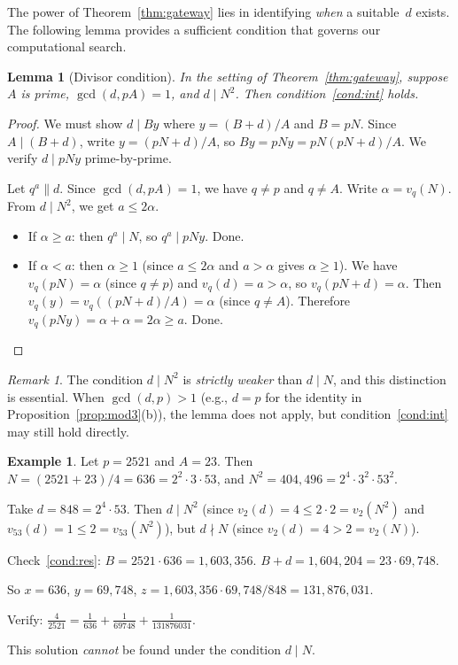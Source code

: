 \documentclass[12pt]{amsart}
\newtheorem{lemma}[theorem]{Lemma}
\theoremstyle{definition}
\newtheorem{example}[theorem]{Example}
\theoremstyle{remark}
\newtheorem{remark}[theorem]{Remark}
\begin{document}
The power of Theorem~\ref{thm:gateway} lies in identifying
\emph{when} a suitable~$d$ exists.
The following lemma provides a sufficient condition that
governs our computational search.

\begin{lemma}[Divisor condition]\label{lem:Nsq}
In the setting of Theorem~\ref{thm:gateway}, suppose $A$ is prime,
$\gcd(d, pA) = 1$, and $d \mid N^2$. Then condition~\ref{cond:int} holds.
\end{lemma}

\begin{proof}
We must show $d \mid By$ where $y = (B+d)/A$ and $B = pN$.
Since $A \mid (B+d)$, write $y = (pN + d)/A$, so $By = pNy = pN(pN+d)/A$.
We verify $d \mid pNy$ prime-by-prime.

Let $q^a \| d$. Since $\gcd(d, pA) = 1$, we have $q \neq p$ and $q \neq A$.
Write $\alpha = v_q(N)$. From $d \mid N^2$, we get $a \leq 2\alpha$.
\begin{itemize}
  \item If $\alpha \geq a$: then $q^a \mid N$, so $q^a \mid pNy$. Done.
  \item If $\alpha < a$: then $\alpha \geq 1$ (since $a \leq 2\alpha$ and $a > \alpha$ gives $\alpha \geq 1$).
    We have $v_q(pN) = \alpha$ (since $q \neq p$) and $v_q(d) = a > \alpha$,
    so $v_q(pN + d) = \alpha$.
    Then $v_q(y) = v_q((pN+d)/A) = \alpha$ (since $q \neq A$).
    Therefore $v_q(pNy) = \alpha + \alpha = 2\alpha \geq a$. Done.
\end{itemize}
\end{proof}

\begin{remark}\label{rem:Nsq}
The condition $d \mid N^2$ is \emph{strictly weaker} than $d \mid N$,
and this distinction is essential.
When $\gcd(d, p) > 1$ (e.g., $d = p$ for the identity in
Proposition~\ref{prop:mod3}(b)), the lemma does not apply,
but condition~\ref{cond:int} may still hold directly.
\end{remark}

\begin{example}\label{ex:2521}
Let $p = 2521$ and $A = 23$.
Then $N = (2521 + 23)/4 = 636 = 2^2 \cdot 3 \cdot 53$,
and $N^2 = 404{,}496 = 2^4 \cdot 3^2 \cdot 53^2$.

Take $d = 848 = 2^4 \cdot 53$.
Then $d \mid N^2$ (since $v_2(d) = 4 \leq 2 \cdot 2 = v_2(N^2)$
and $v_{53}(d) = 1 \leq 2 = v_{53}(N^2)$), but $d \nmid N$
(since $v_2(d) = 4 > 2 = v_2(N)$).

Check~\ref{cond:res}: $B = 2521 \cdot 636 = 1{,}603{,}356$.
$B + d = 1{,}604{,}204 = 23 \cdot 69{,}748$. \checkmark

So $x = 636$, $y = 69{,}748$, $z = 1{,}603{,}356 \cdot 69{,}748 / 848 = 131{,}876{,}031$.

Verify: $\frac{4}{2521} = \frac{1}{636} + \frac{1}{69748} + \frac{1}{131876031}$. \checkmark

This solution \emph{cannot} be found under the condition $d \mid N$.
\end{example}
\end{document}
